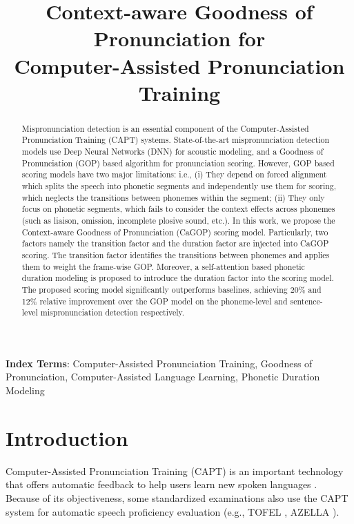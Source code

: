 \documentclass[a4paper]{article}
\title{Context-aware Goodness of Pronunciation for \\ Computer-Assisted Pronunciation Training}
\begin{document}
\maketitle
% 
\begin{abstract}
  Mispronunciation detection is an essential component of the Computer-Assisted Pronunciation Training (CAPT) systems. State-of-the-art mispronunciation detection models use Deep Neural Networks (DNN) for acoustic modeling, and a Goodness of Pronunciation (GOP) based algorithm for pronunciation scoring. %
  However, GOP based scoring models have two major limitations: i.e., (i) They depend on forced alignment which splits the speech into phonetic segments and independently use them for scoring, which neglects the transitions between phonemes within the segment; %
  (ii) They only focus on phonetic segments, which fails to consider the context effects across phonemes (such as liaison, omission, incomplete plosive sound, etc.). 
  In this work, we propose the Context-aware Goodness of Pronunciation (CaGOP) scoring model. Particularly, two factors namely the transition factor and the duration factor are injected into  CaGOP scoring.
  The transition factor identifies the transitions between phonemes and applies them to weight the frame-wise GOP. Moreover, a self-attention based phonetic duration modeling is proposed to introduce the duration factor into the scoring model. 
  The proposed scoring model significantly outperforms baselines, achieving 20\% and 12\% relative improvement over the GOP model on the phoneme-level and sentence-level mispronunciation detection respectively. 
\end{abstract}
\noindent\textbf{Index Terms}: Computer-Assisted Pronunciation Training, Goodness of Pronunciation, Computer-Assisted Language Learning, Phonetic Duration Modeling

\section{Introduction}

Computer-Assisted Pronunciation Training (CAPT) is an important technology that offers automatic feedback to help users learn new spoken languages \cite{neri2002pedagogy}. Because of its objectiveness, some standardized examinations also use the CAPT system for automatic speech proficiency evaluation (e.g., TOFEL \cite{evanini2013automated}, AZELLA \cite{metallinou2014using}).
\end{document}
